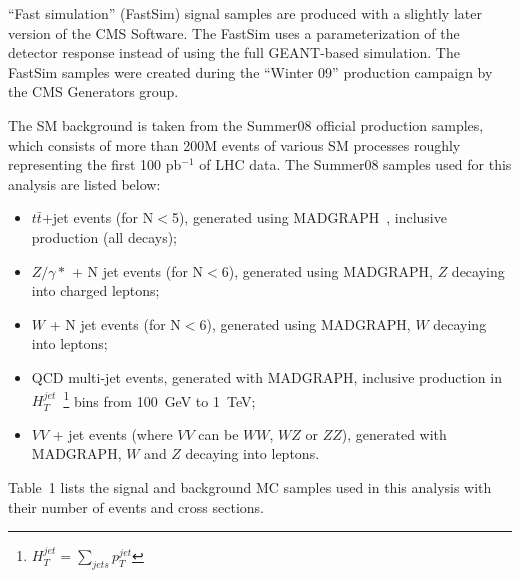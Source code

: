 \documentclass{cmspaper}
\begin{document}
\begin{linenumbers}
``Fast simulation'' (FastSim) signal samples are produced with a slightly later version of the CMS Software.
The FastSim uses a parameterization of the detector response instead of using the full GEANT-based simulation.
The FastSim samples were created during the ``Winter 09'' production campaign by the CMS Generators group.

The SM background is taken from the Summer08 official production samples,
which consists of more than 200M events of various SM processes roughly representing 
the first 100 pb$^{-1}$ of LHC data. The Summer08 samples used for this analysis are listed below:
\begin{itemize}
%
\item $t\bar{t}$+jet events (for N$<$5), generated using MADGRAPH~\cite{MADGRAPH}, inclusive production (all decays); 
%
\item $Z/\gamma*$ + N jet events (for N$<$6), generated using MADGRAPH, $Z$ decaying into charged leptons;  
%
\item $W$ + N jet events (for N$<$6), generated using MADGRAPH, $W$ decaying into leptons; 
%
\item QCD multi-jet events, generated with MADGRAPH, inclusive production in 
$H_{T}^{jet}$~\footnote{$H_{T}^{jet}=\sum_{jets} p_T^{jet}$} bins from 100~GeV to 1~TeV;  
%
%
\item $VV$ + jet events (where $VV$ can be $WW$, $WZ$ or $ZZ$), generated with MADGRAPH, $W$ and $Z$ 
decaying into leptons.
\end{itemize} 

Table~1
lists the signal and background MC samples used in this analysis with their number of events and cross sections.


\end{linenumbers}
\end{document}
